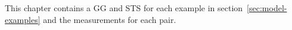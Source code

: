 This chapter contains a GG and STS for each example in section~\ref{sec:model-examples} and the measurements for each pair.

